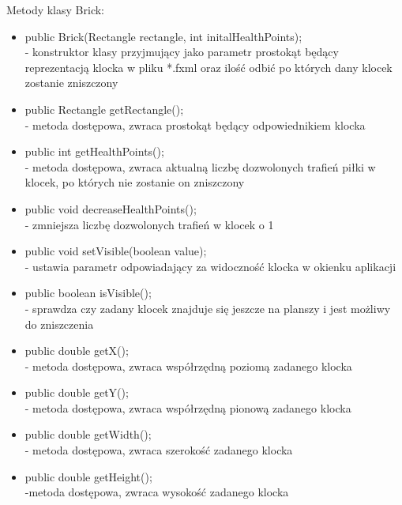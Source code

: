 \documentclass[a4paper]{article}
\begin{document}
Metody klasy Brick:
\begin{itemize}
\item public Brick(Rectangle rectangle, int initalHealthPoints);\\
- konstruktor klasy przyjmujący jako parametr prostokąt będący reprezentacją klocka w pliku                	*.fxml oraz ilość odbić po których dany klocek zostanie zniszczony
    
\item public Rectangle getRectangle();\\
- metoda dostępowa, zwraca prostokąt będący odpowiednikiem klocka
    

\item public int getHealthPoints();\\
- metoda dostępowa, zwraca aktualną liczbę dozwolonych trafień piłki w klocek, po których nie   	zostanie on zniszczony
    
\item public void decreaseHealthPoints();\\
- zmniejsza liczbę dozwolonych trafień w klocek o 1
    
\item public void setVisible(boolean value);\\
- ustawia parametr odpowiadający za widoczność klocka w okienku aplikacji
    
\item public boolean isVisible();\\
- sprawdza czy zadany klocek znajduje się jeszcze na planszy i jest możliwy do zniszczenia
    
\item public double getX();\\
- metoda dostępowa, zwraca współrzędną poziomą zadanego klocka
    
\item public double getY();\\
- metoda dostępowa, zwraca współrzędną pionową zadanego klocka

\item public double getWidth();\\
- metoda dostępowa, zwraca szerokość zadanego klocka
    
\item public double getHeight();\\
-metoda dostępowa, zwraca wysokość zadanego klocka
\end{itemize}
\end{document}
